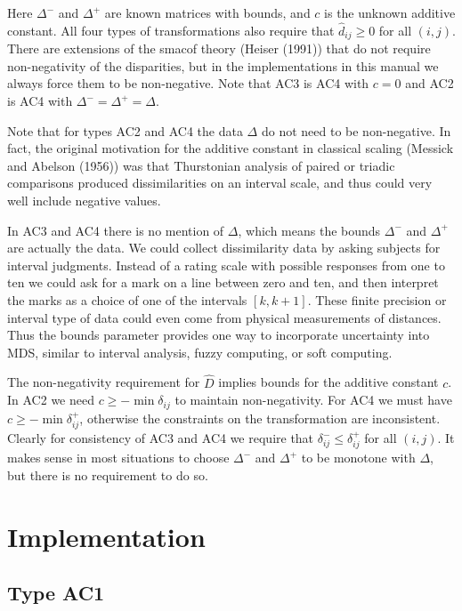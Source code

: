 \documentclass[
  12pt,
]{article}
\begin{document}
Here \(\Delta^-\) and \(\Delta^+\) are known matrices with bounds, and \(c\) is the unknown additive constant. All four types of transformations also require that \(\hat d_{ij}\geq 0\) for all \((i,j)\). There are extensions of the smacof theory (Heiser (1991)) that do not require non-negativity of the disparities, but in the implementations in this manual we always force
them to be non-negative. Note that AC3 is AC4 with \(c=0\) and AC2 is AC4 with \(\Delta^-=\Delta^+=\Delta\).

Note that for types AC2 and AC4 the data \(\Delta\) do not need to be non-negative. In fact,
the original motivation for the additive constant in classical scaling (Messick and Abelson (1956))
was that Thurstonian analysis of paired or triadic comparisons produced dissimilarities on an interval scale, and thus could very well include negative values.

In AC3 and AC4 there is no mention of \(\Delta\), which means
the bounds \(\Delta^-\) and \(\Delta^+\) are actually the data. We could
collect dissimilarity data by asking subjects for interval judgments. Instead
of a rating scale with possible responses from one to ten we could ask
for a mark on a line between zero and ten, and then interpret the
marks as a choice of one of the intervals \([k, k+1]\). These finite precision
or interval type of data could even come from physical measurements of distances.
Thus the bounds parameter provides one way to incorporate uncertainty into MDS, similar to interval analysis, fuzzy computing, or soft computing.

The non-negativity requirement for \(\hat D\) implies bounds for the additive constant
\(c\). In AC2 we need \(c\geq-\min\delta_{ij}\) to maintain non-negativity. For AC4 we must have \(c\geq-\min\delta_{ij}^+\), otherwise the constraints on the transformation are inconsistent.
Clearly for consistency of AC3 and AC4 we require that \(\delta_{ij}^-\leq\delta_{ij}^+\)
for all \((i,j)\). It makes sense in most situations to choose \(\Delta^-\) and \(\Delta^+\)
to be monotone with \(\Delta\), but there is no requirement to do so.

\section{Implementation}\label{implementation}

\subsection{Type AC1}\label{type-ac1}
\end{document}

